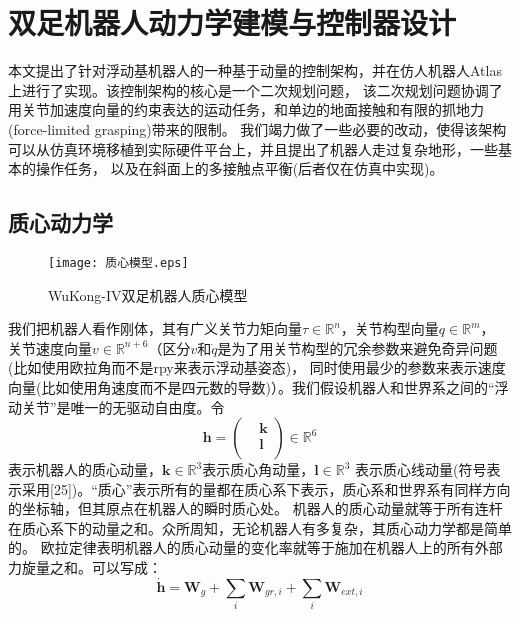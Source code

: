 \section{双足机器人动力学建模与控制器设计}

本文提出了针对浮动基机器人的一种基于动量的控制架构，并在仿人机器人Atlas上进行了实现。该控制架构的核心是一个二次规划问题，
该二次规划问题协调了用关节加速度向量的约束表达的运动任务，和单边的地面接触和有限的抓地力(force-limited grasping)带来的限制。
我们竭力做了一些必要的改动，使得该架构可以从仿真环境移植到实际硬件平台上，并且提出了机器人走过复杂地形，一些基本的操作任务，
以及在斜面上的多接触点平衡(后者仅在仿真中实现)。
\subsection{质心动力学}
\begin{figure}[htbp]
    \centering
    \texttt{[image: 质心模型.eps]}
    \caption{\label{fig:com_model}WuKong-IV双足机器人质心模型}
\end{figure}
我们把机器人看作刚体，其有广义关节力矩向量$\tau \in {{\mathbb{R}}^{n}}$，关节构型向量$q\in {{\mathbb{R}}^{m}}$，
关节速度向量$v\in {{\mathbb{R}}^{n+6}}$（区分$v$和$\dot q$是为了用关节构型的冗余参数来避免奇异问题(比如使用欧拉角而不是rpy来表示浮动基姿态)，
同时使用最少的参数来表示速度向量(比如使用角速度而不是四元数的导数)）。我们假设机器人和世界系之间的“浮动关节”是唯一的无驱动自由度。令
\begin{equation}
    \label{equ:momentum}
    \boldsymbol{h}=\left(\begin{aligned}
        & \boldsymbol{k} \\ 
       & \boldsymbol{l} \\ 
      \end{aligned} \right)\in \mathbb{R}^{6}
\end{equation}
表示机器人的质心动量，$\boldsymbol{k}\in {{\mathbb{R}}^{3}}$表示质心角动量，$\boldsymbol{l}\in {{\mathbb{R}}^{3}}$
表示质心线动量(符号表示采用[25])。“质心”表示所有的量都在质心系下表示，质心系和世界系有同样方向的坐标轴，但其原点在机器人的瞬时质心处。
机器人的质心动量就等于所有连杆在质心系下的动量之和。众所周知，无论机器人有多复杂，其质心动力学都是简单的。
欧拉定律表明机器人的质心动量的变化率就等于施加在机器人上的所有外部力旋量之和。可以写成：
\begin{equation}
    \label{equ:euler's_law}
    \dot{\boldsymbol{h}}={{\boldsymbol{W}}_{g}}+\sum\limits_{i}{{{\boldsymbol{W}}_{gr,i}}}+\sum\limits_{i}{{{\boldsymbol{W}}_{ext,i}}}
\end{equation}
	
